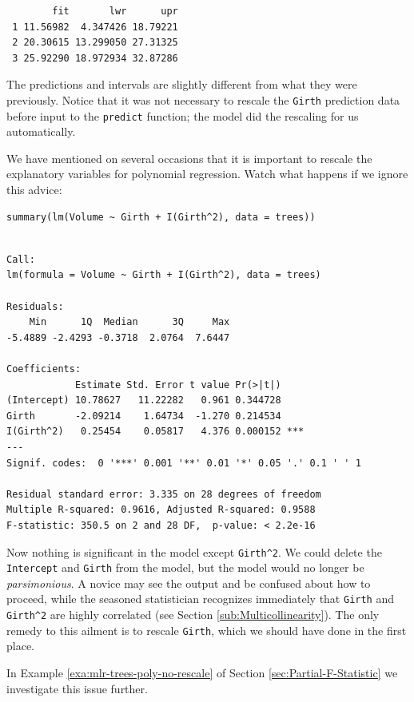 \documentclass[captions=tableheading]{scrbook}
\begin{document}
\begin{verbatim}
        fit       lwr      upr
 1 11.56982  4.347426 18.79221
 2 20.30615 13.299050 27.31325
 3 25.92290 18.972934 32.87286
\end{verbatim}

The predictions and intervals are slightly different from what they were previously. Notice that it was not necessary to rescale the \texttt{Girth} prediction data before input to the \texttt{predict} function; the model did the rescaling for us automatically.

\begin{rem}
We have mentioned on several occasions that it is important to rescale the explanatory variables for polynomial regression. Watch what happens if we ignore this advice:


\begin{verbatim}
summary(lm(Volume ~ Girth + I(Girth^2), data = trees))
\end{verbatim}


\begin{verbatim}

Call:
lm(formula = Volume ~ Girth + I(Girth^2), data = trees)

Residuals:
    Min      1Q  Median      3Q     Max 
-5.4889 -2.4293 -0.3718  2.0764  7.6447 

Coefficients:
            Estimate Std. Error t value Pr(>|t|)    
(Intercept) 10.78627   11.22282   0.961 0.344728    
Girth       -2.09214    1.64734  -1.270 0.214534    
I(Girth^2)   0.25454    0.05817   4.376 0.000152 ***
---
Signif. codes:  0 '***' 0.001 '**' 0.01 '*' 0.05 '.' 0.1 ' ' 1 

Residual standard error: 3.335 on 28 degrees of freedom
Multiple R-squared: 0.9616,	Adjusted R-squared: 0.9588 
F-statistic: 350.5 on 2 and 28 DF,  p-value: < 2.2e-16
\end{verbatim}

Now nothing is significant in the model except \texttt{Girth\textasciicircum{}2}. We could delete the \texttt{Intercept} and \texttt{Girth} from the model, but the model would no longer be \emph{parsimonious}. A novice may see the output and be confused about how to proceed, while the seasoned statistician recognizes immediately that \texttt{Girth} and \texttt{Girth\textasciicircum{}2} are highly correlated (see Section \ref{sub:Multicollinearity}). The only remedy to this ailment is to rescale \texttt{Girth}, which we should have done in the first place.

In Example \ref{exa:mlr-trees-poly-no-rescale} of Section \ref{sec:Partial-F-Statistic} we investigate this issue further.

\end{rem}
\end{document}
